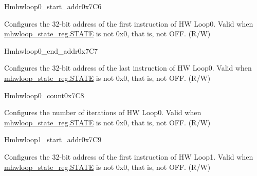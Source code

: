 \begin{register}{H}{mhwloop0\_start\_addr}{0x7C6}\label{regdesc:MHWLOOP0_START_ADDR}
%
\regnewline%
\begin{regdesc}\begin{reglist}
\label{fielddesc:HWLP0_SA}\item [SA] Configures the 32-bit address of the first instruction of HW Loop0. Valid when \hyperref[fielddesc:HWSTATE]{mhwloop\_state\_reg.STATE} is not 0x0, that is, not OFF. (R/W)
\end{reglist}\end{regdesc}
\end{register}

\begin{register}{H}{mhwloop0\_end\_addr}{0x7C7}\label{regdesc:MHWLOOP0_END_ADDR}
%
\regnewline%
\begin{regdesc}\begin{reglist}
\label{fielddesc:HWLP0_EA}\item [EA] Configures the 32-bit address of the last instruction of HW Loop0. Valid when \hyperref[fielddesc:HWSTATE]{mhwloop\_state\_reg.STATE} is not 0x0, that is, not OFF. (R/W)
\end{reglist}\end{regdesc}
\end{register}

\begin{register}{H}{mhwloop0\_count}{0x7C8}\label{regdesc:MHWLOOP0_COUNT}
%
%
\regnewline%
\begin{regdesc}\begin{reglist}
\label{fielddesc:HWLP0_CNT}\item [COUNT] Configures the number of iterations of HW Loop0. Valid when \hyperref[fielddesc:HWSTATE]{mhwloop\_state\_reg.STATE} is not 0x0, that is, not OFF. (R/W)
\end{reglist}\end{regdesc}
\end{register}

\begin{register}{H}{mhwloop1\_start\_addr}{0x7C9}\label{regdesc:MHWLOOP1_START_ADDR}
%
\regnewline%
\begin{regdesc}\begin{reglist}
\label{fielddesc:HWLP1_SA}\item [SA] Configures the 32-bit address of the first instruction of HW Loop1. Valid when \hyperref[fielddesc:HWSTATE]{mhwloop\_state\_reg.STATE} is not 0x0, that is, not OFF. (R/W)
\end{reglist}\end{regdesc}
\end{register}

